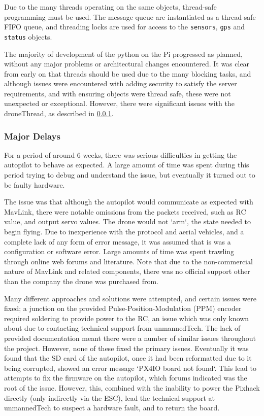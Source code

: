 \documentclass{article}
\begin{document}
Due to the many threads operating on the same objects, thread-safe programming must be used. The message queue are instantiated as a thread-safe FIFO queue, and threading locks are used for access to the \texttt{sensors}, \texttt{gps} and \texttt{status} objects.

The majority of development of the python on the Pi progressed as planned, without any major problems or architectural changes encountered. It was clear from early on that threads should be used due to the many blocking tasks, and although issues were encountered with adding security to satisfy the server requirements, and with ensuring objects were thread safe, these were not unexpected or exceptional. However, there were significant issues with the droneThread, as described in \ref{MajorDelays}.

\subsubsection{Major Delays} \label{MajorDelays}
For a period of around 6 weeks, there was serious difficulties in getting the autopilot to behave as expected. A large amount of time was spent during this period trying to debug and understand the issue, but eventually it turned out to be faulty hardware. 

The issue was that although the autopilot would communicate as expected with MavLink, there were notable omissions from the packets received, such as RC value, and output servo values. The drone would not `arm`, the state needed to begin flying. Due to inexperience with the protocol and aerial vehicles, and a complete lack of any form of error message, it was assumed that is was a configuration or software error. Large amounts of time was spent trawling through online web forums and literature. Note that due to the non-commercial nature of MavLink and related components, there was no official support other than the company the drone was purchased from. 

Many different approaches and solutions were attempted, and certain issues were fixed; a junction on the provided Pulse-Position-Modulation (PPM) encoder required soldering to provide power to the RC, an issue which was only known about due to contacting technical support from unmannedTech\cite{ppmSolder}. The lack of provided documentation meant there were a number of similar issues throughout the project. However, none of these fixed the primary issues. Eventually it was found that the SD card of the autopilot, once it had been reformatted due to it being corrupted, showed an error message `PX4IO board not found`. This lead to attempts to fix the firmware on the autopilot, which forums indicated was the root of the issue. However, this, combined with the inability to power the Pixhack directly (only indirectly via the ESC), lead the technical support at unmannedTech to suspect a hardware fault, and to return the board\cite{px4ioNotFound}. 
\end{document}
